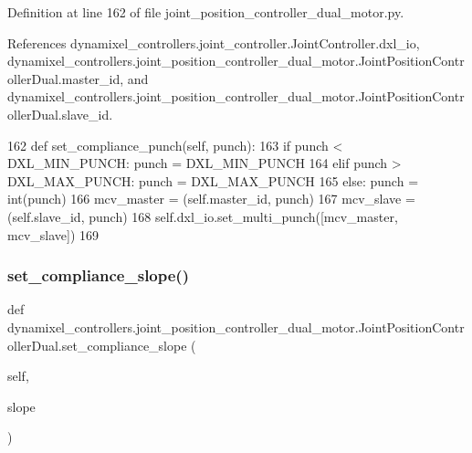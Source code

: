 Definition at line 162 of file joint\+\_\+position\+\_\+controller\+\_\+dual\+\_\+motor.\+py.



References dynamixel\+\_\+controllers.\+joint\+\_\+controller.\+Joint\+Controller.\+dxl\+\_\+io, dynamixel\+\_\+controllers.\+joint\+\_\+position\+\_\+controller\+\_\+dual\+\_\+motor.\+Joint\+Position\+Controller\+Dual.\+master\+\_\+id, and dynamixel\+\_\+controllers.\+joint\+\_\+position\+\_\+controller\+\_\+dual\+\_\+motor.\+Joint\+Position\+Controller\+Dual.\+slave\+\_\+id.


\begin{DoxyCode}
162     \textcolor{keyword}{def }set\_compliance\_punch(self, punch):
163         \textcolor{keywordflow}{if} punch < DXL\_MIN\_PUNCH: punch = DXL\_MIN\_PUNCH
164         \textcolor{keywordflow}{elif} punch > DXL\_MAX\_PUNCH: punch = DXL\_MAX\_PUNCH
165         \textcolor{keywordflow}{else}: punch = int(punch)
166         mcv\_master = (self.master\_id, punch)
167         mcv\_slave = (self.slave\_id, punch)
168         self.dxl\_io.set\_multi\_punch([mcv\_master, mcv\_slave])
169 
\end{DoxyCode}
\mbox{\label{classdynamixel__controllers_1_1joint__position__controller__dual__motor_1_1_joint_position_controller_dual_ab4010d4ed4f5872e422865bdc8a86c96}} 
\subsubsection{\texorpdfstring{set\+\_\+compliance\+\_\+slope()}{set\_compliance\_slope()}}
{\footnotesize\ttfamily def dynamixel\+\_\+controllers.\+joint\+\_\+position\+\_\+controller\+\_\+dual\+\_\+motor.\+Joint\+Position\+Controller\+Dual.\+set\+\_\+compliance\+\_\+slope (\begin{DoxyParamCaption}\item[{}]{self,  }\item[{}]{slope }\end{DoxyParamCaption})}



